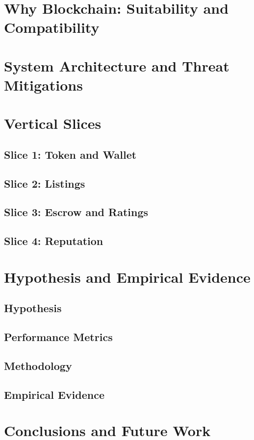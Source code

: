 \documentclass[conference]{IEEEtran}
\begin{document}
\section{Why Blockchain: Suitability and Compatibility}
\label{sec:why}


\section{System Architecture and Threat Mitigations}
\label{sec:arch}


\section{Vertical Slices}
\label{sec:slices}
\subsection{Slice 1: Token and Wallet}
\label{sec:slice1}

\subsection{Slice 2: Listings}
\label{sec:slice2}

\subsection{Slice 3: Escrow and Ratings}
\label{sec:slice3}

\subsection{Slice 4: Reputation}
\label{sec:slice4}


\section{Hypothesis and Empirical Evidence}
\label{sec:eval}
\subsection{Hypothesis}
\label{sec:hypo}

\subsection{Performance Metrics}
\label{sec:metrics}

\subsection{Methodology}
\label{sec:method}

\subsection{Empirical Evidence}
\label{sec:evidence}


\section{Conclusions and Future Work}
\label{sec:concl}



\end{document}
